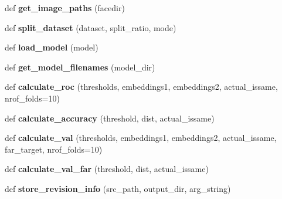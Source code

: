 \begin{DoxyCompactItemize}
\item 
def {\bfseries get\+\_\+image\+\_\+paths} (facedir)\hypertarget{namespacefacenet_aaea60084eb6a8fa08d2916328fc31445}{}\label{namespacefacenet_aaea60084eb6a8fa08d2916328fc31445}

\item 
def {\bfseries split\+\_\+dataset} (dataset, split\+\_\+ratio, mode)\hypertarget{namespacefacenet_a9c02e7ae77e659339c1dfdad52bb9672}{}\label{namespacefacenet_a9c02e7ae77e659339c1dfdad52bb9672}

\item 
def {\bfseries load\+\_\+model} (model)\hypertarget{namespacefacenet_aa5f45188071fba9ce085778952aa238a}{}\label{namespacefacenet_aa5f45188071fba9ce085778952aa238a}

\item 
def {\bfseries get\+\_\+model\+\_\+filenames} (model\+\_\+dir)\hypertarget{namespacefacenet_a088d111a6a03d2c39e70ffb4cf0cedd0}{}\label{namespacefacenet_a088d111a6a03d2c39e70ffb4cf0cedd0}

\item 
def {\bfseries calculate\+\_\+roc} (thresholds, embeddings1, embeddings2, actual\+\_\+issame, nrof\+\_\+folds=10)\hypertarget{namespacefacenet_a9d781a188f85b866a3a0b854bf42de45}{}\label{namespacefacenet_a9d781a188f85b866a3a0b854bf42de45}

\item 
def {\bfseries calculate\+\_\+accuracy} (threshold, dist, actual\+\_\+issame)\hypertarget{namespacefacenet_ab94a07008ed9a2aaabe8779d11652971}{}\label{namespacefacenet_ab94a07008ed9a2aaabe8779d11652971}

\item 
def {\bfseries calculate\+\_\+val} (thresholds, embeddings1, embeddings2, actual\+\_\+issame, far\+\_\+target, nrof\+\_\+folds=10)\hypertarget{namespacefacenet_a891847781d812f6922c60e44cea7e27f}{}\label{namespacefacenet_a891847781d812f6922c60e44cea7e27f}

\item 
def {\bfseries calculate\+\_\+val\+\_\+far} (threshold, dist, actual\+\_\+issame)\hypertarget{namespacefacenet_ac50c9595f2c719fd93f5bb8c6568da23}{}\label{namespacefacenet_ac50c9595f2c719fd93f5bb8c6568da23}

\item 
def {\bfseries store\+\_\+revision\+\_\+info} (src\+\_\+path, output\+\_\+dir, arg\+\_\+string)\hypertarget{namespacefacenet_afd1075cd7525c57f5c9071a49b13332d}{}\label{namespacefacenet_afd1075cd7525c57f5c9071a49b13332d}


\end{DoxyCompactItemize}
